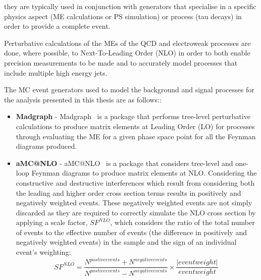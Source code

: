 they are typically used in conjunction with generators that specialise in a specific physics aspect (\ie ME calculations or PS simulation) or process (\eg tau decays) in order to provide a complete event.

Perturbative calculations of the MEs of the QCD and electroweak processes are done, where possible, to Next-To-Leading Order (NLO) in order to both enable precision measurements to be made and to accurately model processes that include multiple high energy jets.

The MC event generators used to model the background and signal processes for the analysis presented in this thesis are as follows::

\begin{itemize}
\item \textbf{Madgraph} - Madgraph~\cite{Alwall:2011uj} is a package that performs tree-level perturbative calculations to produce matrix elements at Leading Order (LO) for processes through evaluating the ME for a given phase space point for all the Feynman diagrams produced.
\item \textbf{aMC@NLO} - aMC@NLO~\cite{Alwall:2014hca} is a package that considers tree-level and one-loop Feynman diagrams to produce matrix elements at NLO.
Considering the constructive and destructive interferences which result from considering both the leading and higher order cross section terms results in positively and negatively weighted events.
These negatively weighted events are not simply discarded as they are required to correctly simulate the NLO cross section by applying a scale factor, $SF^{NLO}$, which considers the ratio of the total number of events to the effective number of events (\ie the difference in positively and negatively weighted events) in the sample and the sign of an individual event's weighting:
\begin{equation}
SF^{NLO} = \frac{N^{postive events} + N^{negative events}}{N^{postive events} - N^{negative events}} \times \frac{|event weight|}{event weight} \;
\end{equation}


\end{itemize}
